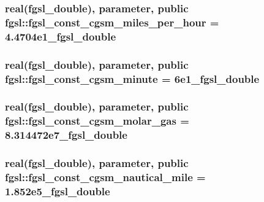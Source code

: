 \subsubsection[{fgsl\+\_\+const\+\_\+cgsm\+\_\+miles\+\_\+per\+\_\+hour}]{\setlength{\rightskip}{0pt plus 5cm}real({\bf fgsl\+\_\+double}), parameter, public fgsl\+::fgsl\+\_\+const\+\_\+cgsm\+\_\+miles\+\_\+per\+\_\+hour = 4.\+4704e1\+\_\+fgsl\+\_\+double}\label{namespacefgsl_a021d66524bb3e4b9305ce5399f11f2ec}
\hypertarget{namespacefgsl_ab028fa17e53d65adbb35fa580f5e25a0}{}
\subsubsection[{fgsl\+\_\+const\+\_\+cgsm\+\_\+minute}]{\setlength{\rightskip}{0pt plus 5cm}real({\bf fgsl\+\_\+double}), parameter, public fgsl\+::fgsl\+\_\+const\+\_\+cgsm\+\_\+minute = 6e1\+\_\+fgsl\+\_\+double}\label{namespacefgsl_ab028fa17e53d65adbb35fa580f5e25a0}
\hypertarget{namespacefgsl_a23addc2e9852914913cdbe8e164b27ae}{}
\subsubsection[{fgsl\+\_\+const\+\_\+cgsm\+\_\+molar\+\_\+gas}]{\setlength{\rightskip}{0pt plus 5cm}real({\bf fgsl\+\_\+double}), parameter, public fgsl\+::fgsl\+\_\+const\+\_\+cgsm\+\_\+molar\+\_\+gas = 8.\+314472e7\+\_\+fgsl\+\_\+double}\label{namespacefgsl_a23addc2e9852914913cdbe8e164b27ae}
\hypertarget{namespacefgsl_ad2fef81cdb19dcaed2ce527744cb8600}{}
\subsubsection[{fgsl\+\_\+const\+\_\+cgsm\+\_\+nautical\+\_\+mile}]{\setlength{\rightskip}{0pt plus 5cm}real({\bf fgsl\+\_\+double}), parameter, public fgsl\+::fgsl\+\_\+const\+\_\+cgsm\+\_\+nautical\+\_\+mile = 1.\+852e5\+\_\+fgsl\+\_\+double}\label{namespacefgsl_ad2fef81cdb19dcaed2ce527744cb8600}
\hypertarget{namespacefgsl_a1130bb96c29d828c350ca8882cac2a6d}{}
